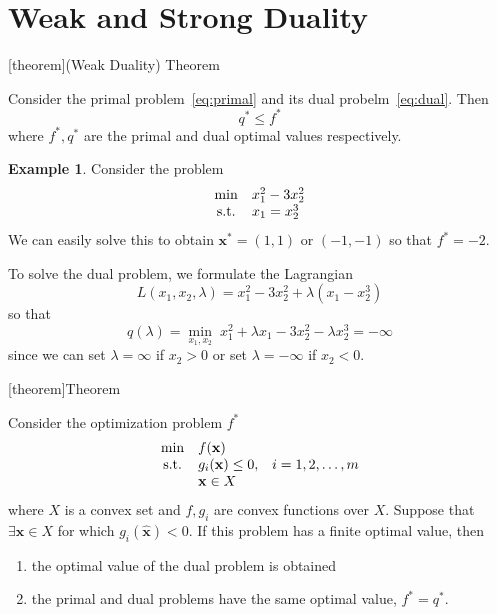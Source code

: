 \documentclass[12pt]{report}
\theoremstyle{definition}
\begin{document}
\section{Weak and Strong Duality}

[theorem]{(Weak Duality) Theorem}
\begin{weak duality}
    Consider the primal problem~\eqref{eq:primal} and its dual
    probelm~\eqref{eq:dual}. Then
    \[
        q^*\le f^*
    \]
    where $f^*,q^*$ are the primal and dual optimal values respectively.
\end{weak duality}

\newtheorem{weak duality example}[theorem]{Example}
\begin{weak duality example}
    Consider the problem
    \begin{equation*}
        \begin{array}{c @{\quad} l}
            \min & x_1^2-3x_2^2 \\
            \text{s.t.} & x_1=x_2^3
        \end{array} 
    \end{equation*}
    We can easily solve this to obtain $\mathbf{x}^*=(1,1)$ or $(-1,-1)$ so that
    $f^*=-2$.

    \medskip\noindent
    To solve the dual problem, we formulate the Lagrangian
    \[
        L(x_1,x_2,\lambda)=x_1^2-3x_2^2+\lambda(x_1-x_2^3)
    \]
    so that
    \[
        q(\lambda)
        =\underset{x_1,x_2}{\min} \;x_1^2+\lambda x_1-3x_2^2-\lambda x_2^3
        =-\infty
    \]
    since we can set $\lambda=\infty$ if $x_2>0$ or set $\lambda=-\infty$ if
    $x_2<0$.
\end{weak duality example}

[theorem]{Theorem}
\begin{strong duality}
    Consider the optimization problem $f^*$
    \begin{equation*}
        \begin{array}{c @{\quad} l @{\quad} l}
            \min & f(\mathbf{x}) & \\
            \text{s.t.} & g_i(\mathbf{x})\le 0, & i = 1,2,\ldots,m \\
                        & \mathbf{x}\in X
        \end{array} 
    \end{equation*}
    where $X$ is a convex set and $f, g_i$ are convex functions over $X$.
    Suppose that $\exists\mathbf{\mathbf{x}}\in X$ for which
    $g_i(\hat{\mathbf{x}})<0$. If this problem has a finite optimal value, then
    \begin{enumerate}
        \item the optimal value of the dual problem is obtained
        \item the primal and dual problems have the same optimal value,
            $f^*=q^*$.
    \end{enumerate}
\end{strong duality}
\end{document}

